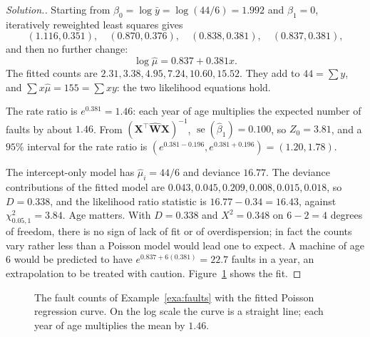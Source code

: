 \documentclass[11pt,a4paper]{article}
\numberwithin{equation}{section}
\theoremstyle{definition}
\newenvironment{solution}
  {\renewcommand{\qedsymbol}{}\begin{proof}[\textit{Solution}.]}
  {\end{proof}}
\begin{document}
\begin{solution}
Starting from $\beta_0 = \log\bar y = \log(44/6) = 1.992$ and $\beta_1 = 0$, iteratively reweighted least squares gives
\[
(1.116, 0.351), \quad (0.870, 0.376), \quad (0.838, 0.381), \quad (0.837, 0.381) ,
\]
and then no further change:
\[
\log\hat\mu = 0.837 + 0.381x .
\]
The fitted counts are $2.31, 3.38, 4.95, 7.24, 10.60, 15.52$. They add to $44 = \sum y$, and
$\sum x\hat\mu = 155 = \sum xy$: the two likelihood equations hold.

The rate ratio is $e^{0.381} = 1.46$: each year of age multiplies the expected number of faults by about $1.46$.
From $(\mathbf{X}^\top\hat{\mathbf{W}}\mathbf{X})^{-1}$, $\operatorname{se}(\hat\beta_1) = 0.100$, so $Z_0 = 3.81$, and a $95\%$ interval for the rate ratio is
$(e^{0.381 - 0.196}, e^{0.381 + 0.196}) = (1.20, 1.78)$.

The intercept-only model has $\hat\mu_i = 44/6$ and deviance $16.77$. The deviance contributions of the fitted model are
$0.043, 0.045, 0.209, 0.008, 0.015, 0.018$, so $D = 0.338$, and the likelihood ratio statistic is $16.77 - 0.34 = 16.43$,
against $\chi^2_{0.05,1} = 3.84$. Age matters. With $D = 0.338$ and $X^2 = 0.348$ on $6 - 2 = 4$ degrees of freedom, there is no
sign of lack of fit or of overdispersion; in fact the counts vary rather less than a Poisson model would
lead one to expect. A machine of age $6$ would be predicted to have $e^{0.837 + 6(0.381)} = 22.7$ faults in a year, an
extrapolation to be treated with caution. Figure~\ref{fig:faults} shows the fit.
\end{solution}

\begin{figure}[H]
\centering
{}
\caption{The fault counts of Example~\ref{exa:faults} with the fitted Poisson regression curve. On the log scale
the curve is a straight line; each year of age multiplies the mean by $1.46$.}
\label{fig:faults}
\end{figure}
\end{document}

